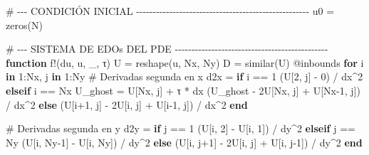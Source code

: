 \documentclass[
  spanish,
  us-letterpaper,
  DIV=11,
  numbers=noendperiod]{scrreprt}
\newenvironment{Shaded}{\begin{snugshade}}{\end{snugshade}}
\newcommand{\CommentTok}[1]{\textcolor[rgb]{0.37,0.37,0.37}{#1}}
\newcommand{\ControlFlowTok}[1]{\textcolor[rgb]{0.00,0.23,0.31}{\textbf{#1}}}
\newcommand{\FloatTok}[1]{\textcolor[rgb]{0.68,0.00,0.00}{#1}}
\newcommand{\FunctionTok}[1]{\textcolor[rgb]{0.28,0.35,0.67}{#1}}
\newcommand{\KeywordTok}[1]{\textcolor[rgb]{0.00,0.23,0.31}{\textbf{#1}}}
\newcommand{\NormalTok}[1]{\textcolor[rgb]{0.00,0.23,0.31}{#1}}
\newcommand{\OperatorTok}[1]{\textcolor[rgb]{0.37,0.37,0.37}{#1}}
\newcommand{\PreprocessorTok}[1]{\textcolor[rgb]{0.68,0.00,0.00}{#1}}
\theoremstyle{plain}
\theoremstyle{definition}
\theoremstyle{remark}
\begin{document}
\begin{Shaded}
\begin{Highlighting}[]
\CommentTok{\# {-}{-}{-} CONDICIÓN INICIAL {-}{-}{-}{-}{-}{-}{-}{-}{-}{-}{-}{-}{-}{-}{-}{-}{-}{-}{-}{-}{-}{-}{-}{-}{-}{-}{-}{-}{-}{-}{-}{-}{-}{-}{-}{-}{-}{-}{-}{-}{-}{-}{-}{-}{-}{-}{-}{-}{-}{-}{-}{-}}
\NormalTok{u0 }\OperatorTok{=} \FunctionTok{zeros}\NormalTok{(N)}

\CommentTok{\# {-}{-}{-} SISTEMA DE EDOs DEL PDE {-}{-}{-}{-}{-}{-}{-}{-}{-}{-}{-}{-}{-}{-}{-}{-}{-}{-}{-}{-}{-}{-}{-}{-}{-}{-}{-}{-}{-}{-}{-}{-}{-}{-}{-}{-}{-}{-}{-}{-}{-}{-}{-}{-}{-}{-}}
\KeywordTok{function} \FunctionTok{f!}\NormalTok{(du, u, \_, τ)}
\NormalTok{    U }\OperatorTok{=} \FunctionTok{reshape}\NormalTok{(u, Nx, Ny)}
\NormalTok{    D }\OperatorTok{=} \FunctionTok{similar}\NormalTok{(U)}
    \PreprocessorTok{@inbounds} \ControlFlowTok{for}\NormalTok{ i }\KeywordTok{in} \FloatTok{1}\OperatorTok{:}\NormalTok{Nx, j }\KeywordTok{in} \FloatTok{1}\OperatorTok{:}\NormalTok{Ny}
        \CommentTok{\# Derivadas segunda en x}
\NormalTok{        d2x }\OperatorTok{=} \ControlFlowTok{if}\NormalTok{ i }\OperatorTok{==} \FloatTok{1}
\NormalTok{            (U[}\FloatTok{2}\NormalTok{, j] }\OperatorTok{{-}} \FloatTok{0}\NormalTok{) }\OperatorTok{/}\NormalTok{ dx}\OperatorTok{\^{}}\FloatTok{2}
        \ControlFlowTok{elseif}\NormalTok{ i }\OperatorTok{==}\NormalTok{ Nx}
\NormalTok{            U\_ghost }\OperatorTok{=}\NormalTok{ U[Nx, j] }\OperatorTok{+}\NormalTok{ τ }\OperatorTok{*}\NormalTok{ dx}
\NormalTok{            (U\_ghost }\OperatorTok{{-}} \FloatTok{2}\NormalTok{U[Nx, j] }\OperatorTok{+}\NormalTok{ U[Nx}\OperatorTok{{-}}\FloatTok{1}\NormalTok{, j]) }\OperatorTok{/}\NormalTok{ dx}\OperatorTok{\^{}}\FloatTok{2}
        \ControlFlowTok{else}
\NormalTok{            (U[i}\OperatorTok{+}\FloatTok{1}\NormalTok{, j] }\OperatorTok{{-}} \FloatTok{2}\NormalTok{U[i, j] }\OperatorTok{+}\NormalTok{ U[i}\OperatorTok{{-}}\FloatTok{1}\NormalTok{, j]) }\OperatorTok{/}\NormalTok{ dx}\OperatorTok{\^{}}\FloatTok{2}
        \ControlFlowTok{end}

        \CommentTok{\# Derivadas segunda en y}
\NormalTok{        d2y }\OperatorTok{=} \ControlFlowTok{if}\NormalTok{ j }\OperatorTok{==} \FloatTok{1}
\NormalTok{            (U[i, }\FloatTok{2}\NormalTok{] }\OperatorTok{{-}}\NormalTok{ U[i, }\FloatTok{1}\NormalTok{]) }\OperatorTok{/}\NormalTok{ dy}\OperatorTok{\^{}}\FloatTok{2}
        \ControlFlowTok{elseif}\NormalTok{ j }\OperatorTok{==}\NormalTok{ Ny}
\NormalTok{            (U[i, Ny}\OperatorTok{{-}}\FloatTok{1}\NormalTok{] }\OperatorTok{{-}}\NormalTok{ U[i, Ny]) }\OperatorTok{/}\NormalTok{ dy}\OperatorTok{\^{}}\FloatTok{2}
        \ControlFlowTok{else}
\NormalTok{            (U[i, j}\OperatorTok{+}\FloatTok{1}\NormalTok{] }\OperatorTok{{-}} \FloatTok{2}\NormalTok{U[i, j] }\OperatorTok{+}\NormalTok{ U[i, j}\OperatorTok{{-}}\FloatTok{1}\NormalTok{]) }\OperatorTok{/}\NormalTok{ dy}\OperatorTok{\^{}}\FloatTok{2}
        \ControlFlowTok{end}


\end{Highlighting}
\end{Shaded}
\end{document}
